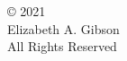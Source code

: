 
\thispagestyle{empty} %
\setcounter{page}{0} %
\null\vfill %
\begin{center}
  \SingleSpace %
\copyright \hspace{1mm} 2021\\
Elizabeth A. Gibson\\
All Rights Reserved\\
\end{center}
\clearpage